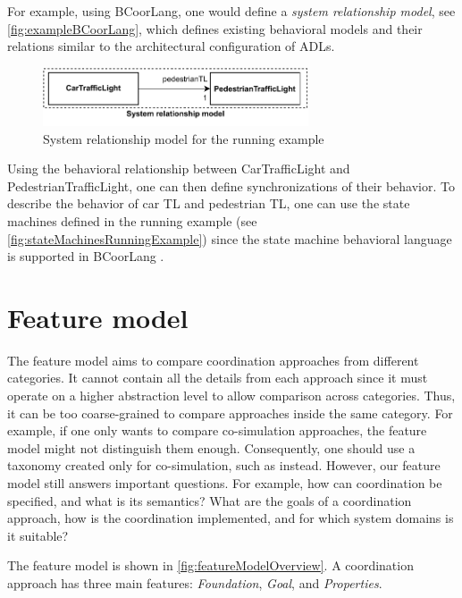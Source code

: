 \documentclass[runningheads]{llncs}
\begin{document}
For example, using BCoorLang, one would define a \textit{system relationship model}, see \autoref{fig:exampleBCoorLang}, which defines existing behavioral models and their relations similar to the architectural configuration of ADLs.

\begin{figure}[ht]
	\centering
	\includegraphics[width=0.7\textwidth]{images/running_example_BCorrLang}
	\caption{System relationship model for the running example}
	\label{fig:exampleBCoorLang}
\end{figure}

Using the behavioral relationship between \textsf{CarTrafficLight} and \textsf{PedestrianTrafficLight}, one can then define synchronizations of their behavior.
To describe the behavior of car TL and pedestrian TL, one can use the state machines defined in the running example (see \autoref{fig:stateMachinesRunningExample}) since the state machine behavioral language is supported in BCoorLang \cite{krauterBehavioralConsistencyMultimodeling2023}.


\section{Feature model} \label{sec:features}
The feature model aims to compare coordination approaches from different categories.
It cannot contain all the details from each approach since it must operate on a higher abstraction level to allow comparison across categories.
Thus, it can be too coarse-grained to compare approaches inside the same category.
For example, if one only wants to compare co-simulation approaches, the feature model might not distinguish them enough.
Consequently, one should use a taxonomy created only for co-simulation, such as \cite{gomesCoSimulationSurvey2019} instead.
However, our feature model still answers important questions.
For example, how can coordination be specified, and what is its semantics?
What are the goals of a coordination approach, how is the coordination implemented, and for which system domains is it suitable?

The feature model is shown in \autoref{fig:featureModelOverview}.
A coordination approach has three main features: \textit{Foundation}, \textit{Goal}, and \textit{Properties}.
\end{document}
